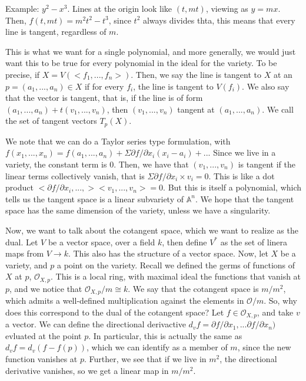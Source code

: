 \documentclass[10pt]{article}
\begin{document}
Example: $y^2 - x^3$. Lines at the origin look like $(t,mt)$, viewing as $y = mx$. Then, $f(t,mt) = m^2t^2 - t^3$, since $t^2$ always divides thta, this means that every line is tangent, regardless of $m$.

This is what we want for a single polynomial, and more generally, we would just want this to be true for every polynomial in the ideal for the variety. To be precise, if $X = V(< f_1,...,f_n > )$. Then, we say the line is tangent to $X$ at an $p = (a_1,...,a_n) \in X$ if for every $f_i$, the line is tangent to $V(f_i)$. We also say that the vector is tangent, that is, if the line is of form $(a_1,...,a_n) + t (v_1,...,v_n)$, then $(v_1,...,v_n)$ tangent at $(a_1,...,a_n)$. We call the set of tangent vectors $T_p(X)$.

We note that we can do a Taylor series type formulation, with $f(x_1,...,x_n) = f(a_1,...,a_n) + \Sigma \partial f/\partial x_i (x_i - a_i) + ...$ Since we live in a variety, the constant term is $0$. Then, we have that $(v_1,...,v_n)$ is tangent if the linear terms collectively vanish, that is $\Sigma \partial f / \partial x_i \times v_i  = 0$. This is like a dot product $< \partial f / \partial x_i,...,> < v_1,...,v_n > = 0$. But this is itself a polynomial, which tells us the tangent space is a linear subvariety of $\mathbb{A}^n$. We hope that the tangent space has the same dimension of the variety, unless we have a singularity.

Now, we want to talk about the cotangent space, which we want to realize as the dual. Let $V$ be a vector space, over a field $k$, then define $V^*$ as the set of linera maps from $V \to k$. This also has the structure of a vector space. Now, let $X$ be a variety, and $p$ a point on the variety. Recall we defined the germs of functions of $X$ at $p$, $\mathcal{O}_{X,p}$. This is a local ring, with maximal ideal the functions that vanish at $p$, and we notice that $\mathcal{O}_{X,p} / m \cong k$. We say that the cotangent space is $m / m^2$, which admits a well-defined multiplication against the elements in $\mathcal{O}/m$. So, why does this correspond to the dual of the cotangent space? Let $f \in \mathcal{O}_{X,p}$, and take $v$ a vector. We can define the directional derivactive $d_v f = \partial f / \partial x_1, ... \partial f / \partial x_n)$ evluated at the point $p$. In particular, this is actually the same as  $ d_v f  = d_v (f - f(p))$, which we can identify as a member of $m$,  since the new function vanishes at $p$. Further, we see that if we live in $m^2$, the directional derivative vanishes, so we get a linear map in $m/m^2$.
\end{document}
